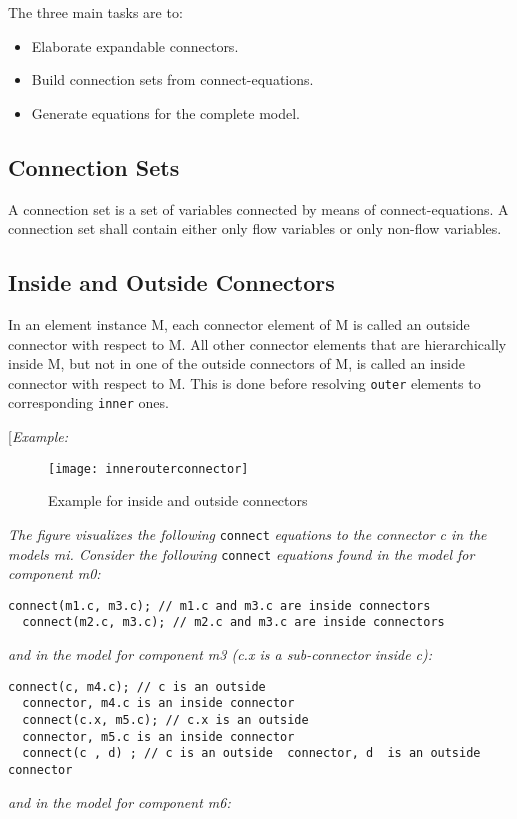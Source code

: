 The three main tasks are to:

\begin{itemize}
\item
  Elaborate expandable connectors.
\item
  Build connection sets from connect-equations.
\item
  Generate equations for the complete model.
\end{itemize}

\subsection{Connection Sets}

A connection set is a set of variables connected by means of
connect-equations. A connection set shall contain either only flow
variables or only non-flow variables.

\subsection{Inside and Outside Connectors}

In an element instance M, each connector element of M is called an
outside connector with respect to M. All other connector elements that
are hierarchically inside M, but not in one of the outside connectors of
M, is called an inside connector with respect to M. This is done before
resolving \lstinline!outer! elements to corresponding \lstinline!inner! ones.

{[}\emph{Example:}
\begin{figure}[H]
\texttt{[image: innerouterconnector]}
\caption{Example for inside and outside connectors}
\end{figure}
\emph{The figure visualizes the following} \lstinline!connect! \emph{equations to
the connector c in the models m\textit{i}. Consider the
following} \lstinline!connect! \emph{equations found in the model for component m0:}

\begin{lstlisting}[language=modelica]
  connect(m1.c, m3.c); // m1.c and m3.c are inside connectors
  connect(m2.c, m3.c); // m2.c and m3.c are inside connectors
\end{lstlisting}
\emph{and in the model for component m3 (c.x is a sub-connector inside
c):}

\begin{lstlisting}[language=modelica]
  connect(c, m4.c); // c is an outside
  connector, m4.c is an inside connector
  connect(c.x, m5.c); // c.x is an outside
  connector, m5.c is an inside connector
  connect(c , d) ; // c is an outside  connector, d  is an outside connector
\end{lstlisting}
\emph{and in the model for component m6:}


